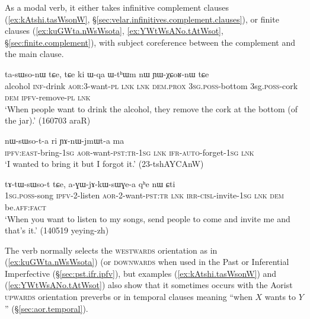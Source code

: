 As a modal verb, it either takes infinitive complement clauses (\ref{ex:kAtshi.tasWsonW}, §\ref{sec:velar.infinitives.complement.clauses}), or finite clauses (\ref{ex:kuGWta.nWsWsota}, \ref{ex:YWtWsANo.tAtWsot}, §\ref{sec:finite.complement}), with subject coreference between the complement and the main clause.  
 
\begin{exe}
\ex \label{ex:kAtshi.tasWsonW}
 ta-sɯso-nɯ tɕe, tɕe ki ɯ-qa ɯ-tʰɯm nɯ ɲɯ-χɕoʁ-nɯ tɕe \\
alcohol \textsc{inf}-drink \textsc{aor}:3\flobv{}-want-\textsc{pl} \textsc{lnk} \textsc{lnk} \textsc{dem}.\textsc{prox} \textsc{3sg}.\textsc{poss}-bottom {3sg}.\textsc{poss}-cork \textsc{dem} \textsc{ipfv}-remove-\textsc{pl} \textsc{lnk} \\
\glt `When people want to drink the alcohol, they remove the cork at the bottom (of the jar).' (160703 araR)
\end{exe}

\begin{exe}
\ex \label{ex:kuGWta.nWsWsota}
\gll [ku-ɣɯt-a] nɯ-sɯso-t-a ri ɲɤ-nɯ-jmɯt-a ma \\
\textsc{ipfv}:\textsc{east}-bring-\textsc{1sg} \textsc{aor}-want-\textsc{pst}:\textsc{tr}-\textsc{1sg} \textsc{lnk} \textsc{ifr}-\textsc{auto}-forget-\textsc{1sg} \textsc{lnk} \\
\glt `I wanted to bring it but I forgot it.' (23-tshAYCAnW)
\end{exe}
 
\begin{exe}
\ex \label{ex:YWtWsANo.tAtWsot}
 tɤ-tɯ-sɯso-t tɕe, a-ɣɯ-jɤ-kɯ-sɯɣe-a qʰe nɯ ɕti \\
\textsc{1sg}.\textsc{poss}-song \textsc{ipfv}-2-listen \textsc{aor}-2-want-\textsc{pst}:\textsc{tr} \textsc{lnk} \textsc{irr}-\textsc{cisl}-invite-\textsc{1sg} \textsc{lnk} \textsc{dem} be.\textsc{aff}:\textsc{fact} \\
\glt   `When you want to listen to my songs, send people to come and invite me and that's it.' (140519 yeying-zh)
\end{exe}

The verb  normally selects the \textsc{westwards} orientation as in (\ref{ex:kuGWta.nWsWsota}) (or \textsc{downwards} when used in the Past or Inferential Imperfective (§\ref{sec:pst.ifr.ipfv}), but examples (\ref{ex:kAtshi.tasWsonW}) and (\ref{ex:YWtWsANo.tAtWsot}) also show that it sometimes occurs with the Aorist \textsc{upwards} orientation preverbs  or  in temporal clauses meaning ``when $X$ wants to $Y$'' (§\ref{sec:aor.temporal}).
  

